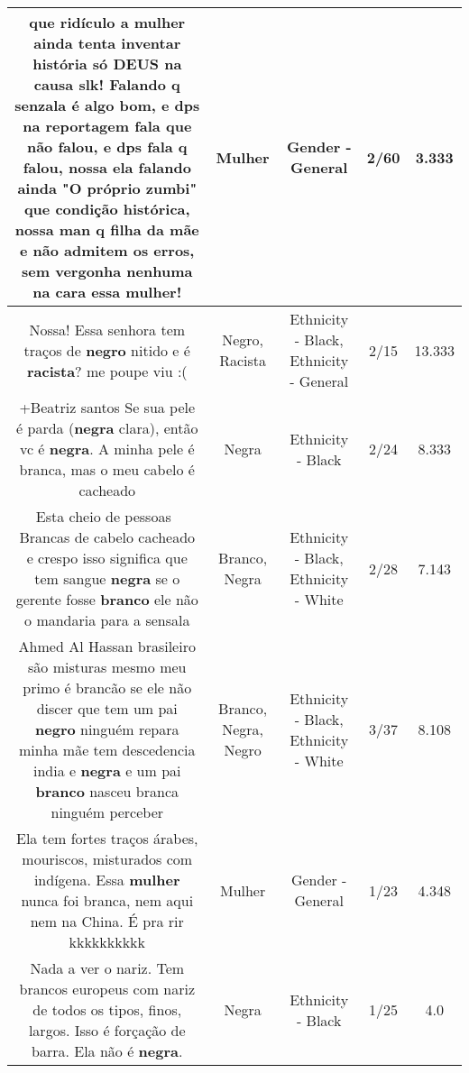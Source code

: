 \documentclass[11pt]{article}
\newlength\mylength
\begin{document}
\begin{center}
\begin{longtable}{|C{.65\mylength}|C{.30\mylength}|C{.12\mylength}|C{.12\mylength}|C{.12\mylength}|}
  \small que ridículo a \textbf{mulher} ainda tenta inventar história só DEUS na causa slk! Falando q senzala é algo bom, e dps na reportagem fala que não falou, e dps fala q falou, nossa ela falando ainda "O próprio zumbi" que condição histórica, nossa man q filha da mãe e não admitem os erros, sem vergonha nenhuma na cara essa \textbf{mulher}!\normalsize   & Mulher & Gender - General & 2/60 & 3.333 \\  \hline
  \small Nossa! Essa senhora tem traços de \textbf{negro} nitido e é \textbf{racista}? me poupe viu :(\normalsize   & Negro, Racista & Ethnicity - Black, Ethnicity - General & 2/15 & 13.333 \\  \hline
  \small +Beatriz santos Se sua pele é parda (\textbf{negra} clara), então vc é \textbf{negra}. A minha pele é branca, mas o meu cabelo é cacheado\normalsize   & Negra & Ethnicity - Black & 2/24 & 8.333 \\  \hline
  \small Esta cheio de pessoas  Brancas de cabelo cacheado e crespo isso significa que tem sangue \textbf{negra} se o gerente fosse \textbf{branco} ele não o mandaria para a sensala\normalsize   & Branco, Negra & Ethnicity - Black, Ethnicity - White & 2/28 & 7.143 \\  \hline
  \small Ahmed Al Hassan brasileiro são misturas mesmo meu primo é brancão se ele não discer que tem um pai \textbf{negro} ninguém repara minha mãe tem descedencia india e \textbf{negra} e um pai \textbf{branco} nasceu branca ninguém perceber\normalsize   & Branco, Negra, Negro & Ethnicity - Black, Ethnicity - White & 3/37 & 8.108 \\  \hline
  \small Ela tem fortes traços árabes, mouriscos, misturados com indígena. Essa \textbf{mulher} nunca foi branca, nem aqui nem na China. É pra rir kkkkkkkkkk\normalsize   & Mulher & Gender - General & 1/23 & 4.348 \\  \hline
  \small Nada a ver o nariz. Tem brancos europeus com nariz de todos os tipos, finos, largos. Isso é forçação de barra. Ela não é \textbf{negra}.\normalsize   & Negra & Ethnicity - Black & 1/25 & 4.0 \\  \hline

\end{longtable}
\end{center}
\end{document}

